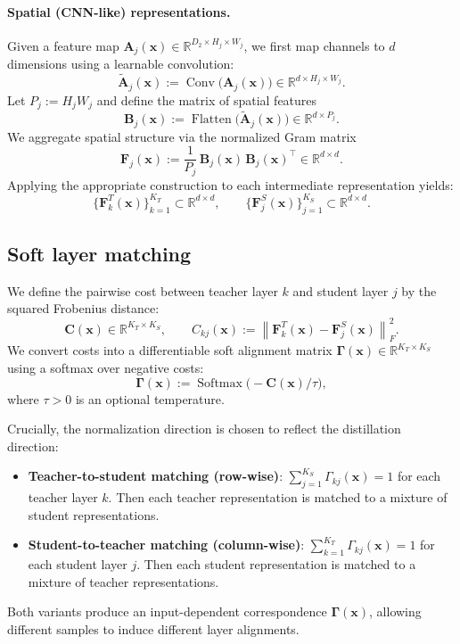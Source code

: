 \documentclass[11pt]{article}
\begin{document}
\paragraph{Spatial (CNN-like) representations.}
Given a feature map \(\mathbf{A}_j(\mathbf{x})\in\mathbb{R}^{D_2\times H_j\times W_j}\), we first map channels to \(d\) dimensions using a learnable convolution:
\[
\widetilde{\mathbf{A}}_j(\mathbf{x}) := \operatorname{Conv}\big(\mathbf{A}_j(\mathbf{x})\big)\in\mathbb{R}^{d\times H_j\times W_j}.
\]
Let \(P_j:=H_jW_j\) and define the matrix of spatial features
\[
\mathbf{B}_j(\mathbf{x})
:= \operatorname{Flatten}\big(\widetilde{\mathbf{A}}_j(\mathbf{x})\big)
\in\mathbb{R}^{d\times P_j}.
\]
We aggregate spatial structure via the normalized Gram matrix
\[
\mathbf{F}_j(\mathbf{x})
:= \frac{1}{P_j}\,\mathbf{B}_j(\mathbf{x})\,\mathbf{B}_j(\mathbf{x})^\top
\in\mathbb{R}^{d\times d}.
\]
Applying the appropriate construction to each intermediate representation yields:
\[
\{\mathbf{F}^T_k(\mathbf{x})\}_{k=1}^{K_T}\subset\mathbb{R}^{d\times d},
\qquad
\{\mathbf{F}^S_j(\mathbf{x})\}_{j=1}^{K_S}\subset\mathbb{R}^{d\times d}.
\]

\subsection{Soft layer matching}

We define the pairwise cost between teacher layer \(k\) and student layer \(j\) by the squared Frobenius distance:
\[
\mathbf{C}(\mathbf{x})\in\mathbb{R}^{K_T\times K_S},
\qquad
C_{kj}(\mathbf{x})
:= \left\lVert \mathbf{F}^T_k(\mathbf{x}) - \mathbf{F}^S_j(\mathbf{x}) \right\rVert_F^2.
\]
We convert costs into a differentiable soft alignment matrix \(\boldsymbol{\Gamma}(\mathbf{x})\in\mathbb{R}^{K_T\times K_S}\) using a softmax over negative costs:
\[
\boldsymbol{\Gamma}(\mathbf{x})
:= \operatorname{Softmax}\!\big(-\mathbf{C}(\mathbf{x})/\tau\big),
\]
where \(\tau>0\) is an optional temperature.

Crucially, the normalization direction is chosen to reflect the distillation direction:
\begin{itemize}
    \item \textbf{Teacher-to-student matching (row-wise)}:
    \(\sum_{j=1}^{K_S}\Gamma_{kj}(\mathbf{x})=1\) for each teacher layer \(k\).
    Then each teacher representation is matched to a mixture of student representations.

    \item \textbf{Student-to-teacher matching (column-wise)}:
    \(\sum_{k=1}^{K_T}\Gamma_{kj}(\mathbf{x})=1\) for each student layer \(j\).
    Then each student representation is matched to a mixture of teacher representations.
\end{itemize}
Both variants produce an input-dependent correspondence \(\boldsymbol{\Gamma}(\mathbf{x})\), allowing different samples to induce different layer alignments.
\end{document}
